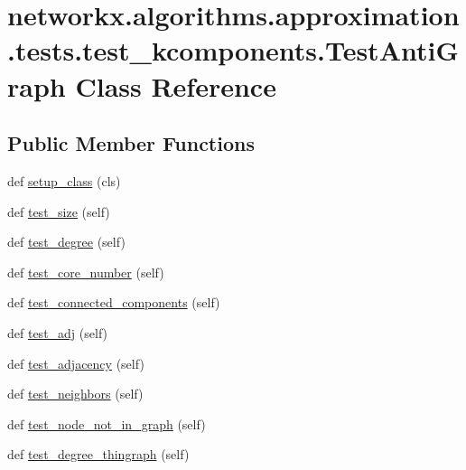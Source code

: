 \hypertarget{classnetworkx_1_1algorithms_1_1approximation_1_1tests_1_1test__kcomponents_1_1TestAntiGraph}{}\section{networkx.\+algorithms.\+approximation.\+tests.\+test\+\_\+kcomponents.\+Test\+Anti\+Graph Class Reference}
\label{classnetworkx_1_1algorithms_1_1approximation_1_1tests_1_1test__kcomponents_1_1TestAntiGraph}
\subsection*{Public Member Functions}
\begin{DoxyCompactItemize}
\item 
def \hyperlink{classnetworkx_1_1algorithms_1_1approximation_1_1tests_1_1test__kcomponents_1_1TestAntiGraph_ac60e021e2676e1f2edbb7c77278ed179}{setup\+\_\+class} (cls)
\item 
def \hyperlink{classnetworkx_1_1algorithms_1_1approximation_1_1tests_1_1test__kcomponents_1_1TestAntiGraph_ae3236f1069b491e9afa6eaae83bb00ff}{test\+\_\+size} (self)
\item 
def \hyperlink{classnetworkx_1_1algorithms_1_1approximation_1_1tests_1_1test__kcomponents_1_1TestAntiGraph_a23e36fbba137606be1d74cf33ea1ea2d}{test\+\_\+degree} (self)
\item 
def \hyperlink{classnetworkx_1_1algorithms_1_1approximation_1_1tests_1_1test__kcomponents_1_1TestAntiGraph_abf690c6be8caac7af686e89a1f018153}{test\+\_\+core\+\_\+number} (self)
\item 
def \hyperlink{classnetworkx_1_1algorithms_1_1approximation_1_1tests_1_1test__kcomponents_1_1TestAntiGraph_a7da81d64ea62f2d2b575193fcf97794b}{test\+\_\+connected\+\_\+components} (self)
\item 
def \hyperlink{classnetworkx_1_1algorithms_1_1approximation_1_1tests_1_1test__kcomponents_1_1TestAntiGraph_a872652137996e8187162ba820b0463ff}{test\+\_\+adj} (self)
\item 
def \hyperlink{classnetworkx_1_1algorithms_1_1approximation_1_1tests_1_1test__kcomponents_1_1TestAntiGraph_ae270370b4ffc22c48c4df1a1d73e588a}{test\+\_\+adjacency} (self)
\item 
def \hyperlink{classnetworkx_1_1algorithms_1_1approximation_1_1tests_1_1test__kcomponents_1_1TestAntiGraph_ac484019a3d9e5b6300b7a0d195a18456}{test\+\_\+neighbors} (self)
\item 
def \hyperlink{classnetworkx_1_1algorithms_1_1approximation_1_1tests_1_1test__kcomponents_1_1TestAntiGraph_a54ea369199d70390071c7e2cbf800a0e}{test\+\_\+node\+\_\+not\+\_\+in\+\_\+graph} (self)
\item 
def \hyperlink{classnetworkx_1_1algorithms_1_1approximation_1_1tests_1_1test__kcomponents_1_1TestAntiGraph_a3d0baa1bff4124ad7e3ce3d6dbf3d360}{test\+\_\+degree\+\_\+thingraph} (self)
\end{DoxyCompactItemize}
